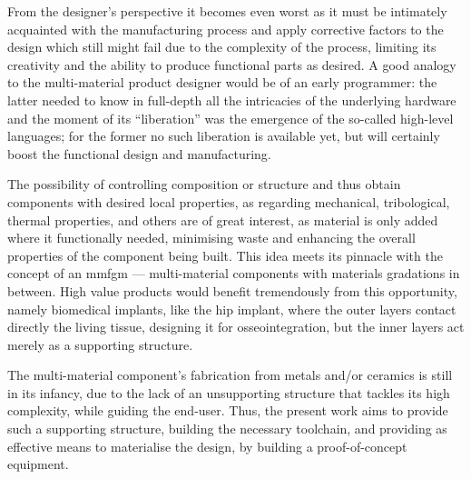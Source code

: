 From the designer's perspective it becomes even worst as it must be intimately
acquainted with the manufacturing process and apply corrective factors to the
design which still might fail due to the complexity of the process, limiting its
creativity and the ability to produce functional parts as desired. A good
analogy to the multi-material product designer would be of an early programmer:
the latter needed to know in full-depth all the intricacies of the underlying
hardware and the moment of its ``liberation'' was the emergence of the so-called
high-level languages; for the former no such liberation is available yet, but
will certainly boost the functional design and manufacturing.

The possibility of controlling composition or structure and thus obtain
components with desired local properties, as regarding mechanical, tribological,
thermal properties, and others are of great interest, as material is only added
where it functionally needed, minimising waste and enhancing the overall
properties of the component being built. 
This idea meets its pinnacle with the concept of an \gls{mmfgm} --- multi-material components with materials gradations in between. High value products
would benefit tremendously from this opportunity, namely biomedical implants,
like the hip implant, where the outer layers contact directly the living tissue,
designing it for osseointegration, but the inner layers act merely as a
supporting structure.

The multi-material component's fabrication from metals and/or ceramics is still
in its infancy, due to the lack of an unsupporting structure that tackles its
high complexity, while guiding the end-user. Thus, the present work aims to
provide such a supporting structure, building the necessary toolchain, and providing as
effective means to materialise the design, by building a proof-of-concept
equipment.


